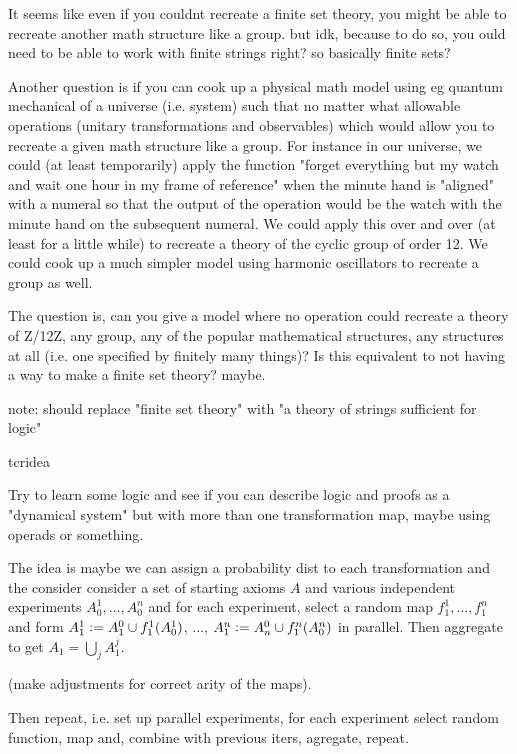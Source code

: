 \documentclass{book}
\begin{document}
	It seems like even if you couldnt recreate a finite set theory, you might be able to recreate another math structure like a group. but idk, because to do so, you ould need to be able to work with finite strings right? so basically finite sets?
	
	Another question is if you can cook up a physical math model using eg quantum mechanical of a universe (i.e. system) such that no matter what allowable operations (unitary transformations and observables) which would allow you to recreate a given math structure like a group. For instance in our universe, we could (at least temporarily) apply the function "forget everything but my watch and wait one hour in my frame of reference" when the minute hand is "aligned" with a numeral so that the output of the operation would be the watch with the minute hand on the subsequent numeral. We could apply this over and over (at least for a little while) to recreate a theory of the cyclic group of order 12. We could cook up a much simpler model using harmonic oscillators to recreate a group as well. 
	
	The question is, can you give a model where no operation could recreate a theory of Z/12Z, any group, any of the popular mathematical structures, any structures at all (i.e. one specified by finitely many things)? Is this equivalent to not having a way to make a finite set theory? maybe. 
	
	note: should replace "finite set theory" with "a theory of strings sufficient for logic"
	
	
	
	
	tcr{idea}
	
	Try to learn some logic and see if you can describe logic and proofs as a "dynamical system" but with more than one transformation map, maybe using operads or something. 
	
	The idea is maybe we can assign a probability  dist to each transformation and the consider consider a set of starting axioms $A$ and various independent experiments $A_0^1, \ldots, A_0^n$ and for each experiment, select a random map $f^1_1, \ldots, f^n_1$ and form $A^1_1 \vcentcolon= A_1^0 \cup f^1_1(A^1_0)$, ..., $A^n_1 \vcentcolon= A_n^0 \cup f^n_1(A^n_0)$ in parallel. Then aggregate to get $A_1 = \bigcup_j A^j_1$. 
	
	(make adjustments for correct arity of the maps).
	
	Then repeat, i.e. set up parallel experiments, for each experiment select random function, map and, combine with previous iters, agregate, repeat. 
	
\end{document}
